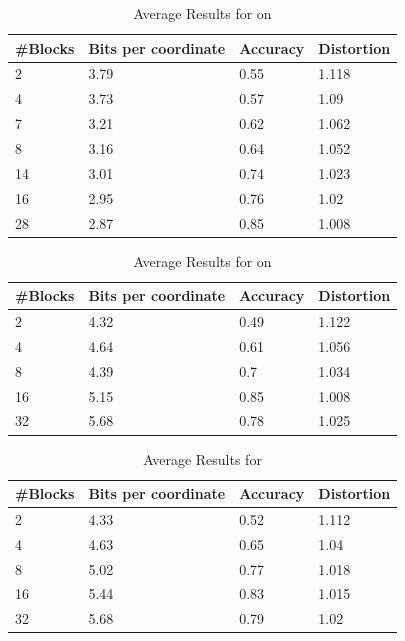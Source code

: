\begin{table}[h]
	\centering
	\caption{Average Results for \qsr{} on  \mnist{}}
	\label{table:avg_mnist_qsr2}
	\begin{tabular}{l l l l}
		\hline
		\#Blocks & Bits per coordinate & Accuracy  & Distortion \\ \hline
		2 & 3.79 & 0.55 & 1.118  \\
		4 & 3.73 & 0.57 & 1.09  \\
		7 & 3.21 & 0.62 & 1.062 \\
		8 & 3.16 & 0.64 & 1.052 \\
		14 & 3.01 & 0.74 & 1.023 \\
		16 & 2.95 & 0.76 & 1.02 \\
		28 & 2.87 & 0.85 & 1.008 \\
		\hline
	\end{tabular}
\end{table}


\begin{table}[h!]
	\centering
	\caption{Average Results for \qs{} on \sift{}}
	\label{table:avg_sift_qs}
	\begin{tabular}{l l l l}
		\hline
		\#Blocks & Bits per coordinate & Accuracy  & Distortion \\ \hline
		2 & 4.32 & 0.49 & 1.122  \\
		4 & 4.64 & 0.61 & 1.056  \\
		8 & 4.39 & 0.7 & 1.034 \\
		16 & 5.15 & 0.85 & 1.008 \\
		32 & 5.68 & 0.78 & 1.025 \\
		\hline
	\end{tabular}
\end{table}

\begin{table}[h!]
	\centering
	\caption{Average Results for \qsr{} \sift{}}
	\label{table:avg_sift_qsr}
	\begin{tabular}{l l l l}
		\hline
		\#Blocks & Bits per coordinate & Accuracy  & Distortion \\ \hline
		2 & 4.33 & 0.52 & 1.112  \\
		4 & 4.63 & 0.65 & 1.04  \\
		8 & 5.02 & 0.77 & 1.018 \\
		16 & 5.44 & 0.83 & 1.015 \\
		32 & 5.68 & 0.79 & 1.02 \\
		\hline
	\end{tabular}
\end{table}

